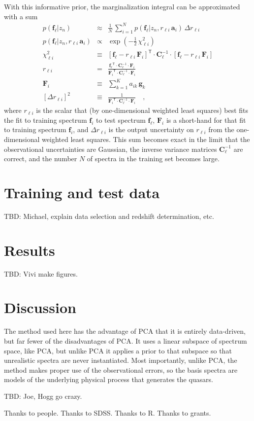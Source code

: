 \documentclass[preprint]{aastex}
\newcommand{\mmatrix}[1]{\boldsymbol{#1}}
\newcommand{\inverse}[1]{{#1}^{-1}}
\newcommand{\transpose}[1]{{#1}^{\mathsf{T}}}
\newcommand{\covar}{\mmatrix{C}}
\newcommand{\avec}{\mmatrix{a}}
\newcommand{\fvec}{\mmatrix{f}}
\newcommand{\Fvec}{\mmatrix{F}}
\newcommand{\gvec}{\mmatrix{g}}
\newcommand{\invvar}{\inverse{\covar}}
\begin{document}
With this informative prior, the marginalization integral can be
approximated with a sum
\begin{eqnarray}\displaystyle
p(\fvec_\ell|z_n) &\approx& \frac{1}{N}\,\sum_{i=1}^N p(\fvec_\ell|z_n,r_{\ell i}\,\avec_i)\,\Delta r_{\ell i} \nonumber\\
p(\fvec_\ell|z_n,r_{\ell i}\,\avec_i) &\propto& \exp(-\frac{1}{2}\,\chi^2_{\ell i}) \nonumber\\
\chi^2_{\ell i} &\equiv& \transpose{[\fvec_\ell - r_{\ell i}\,\Fvec_i]}\cdot\invvar_\ell\cdot[\fvec_\ell - r_{\ell i}\,\Fvec_i] \nonumber\\
r_{\ell i} &=& \frac{\transpose{\fvec_\ell}\cdot\invvar_\ell\cdot\Fvec_i}{\transpose{\Fvec_i}\cdot\invvar_\ell\cdot\Fvec_i} \nonumber\\
\Fvec_i &\equiv& \sum_{k=1}^K a_{ik}\,\gvec_k \nonumber\\
{}[\Delta r_{\ell i}]^2 &\equiv& \frac{1}{\transpose{\Fvec_i}\cdot\invvar_\ell\cdot\Fvec_i}
\quad ,
\end{eqnarray}
where $r_{\ell i}$ is the scalar that (by one-dimensional weighted
least squares) best fits the fit to training spectrum $\fvec_i$ to
test spectrum $\fvec_\ell$, $\Fvec_i$ is a short-hand for that fit to
training spectrum $\fvec_i$, and $\Delta r_{\ell i}$ is the output
uncertainty on $r_{\ell i}$ from the one-dimensional weighted least
squares.  This sum becomes exact in the limit that the observational
uncertainties are Gaussian, the inverse variance matrices
$\invvar_\ell$ are correct, and the number $N$ of spectra in the
training set becomes large.

\section{Training and test data}

TBD:  Michael, explain data selection and redshift determination, etc.

\section{Results}

TBD:  Vivi make figures.

\section{Discussion}

The method used here has the advantage of PCA that it is entirely
data-driven, but far fewer of the disadvantages of PCA.  It uses a
linear subspace of spectrum space, like PCA, but unlike PCA it applies
a prior to that subspace so that unrealistic spectra are never
instantiated.  Most importantly, unlike PCA, the method makes proper
use of the observational errors, so the basis spectra are models of
the underlying physical process that generates the quasars.

TBD:  Joe, Hogg go crazy.

\acknowledgements
Thanks to people.  Thanks to SDSS.  Thanks to R.  Thanks to grants.
\end{document}
